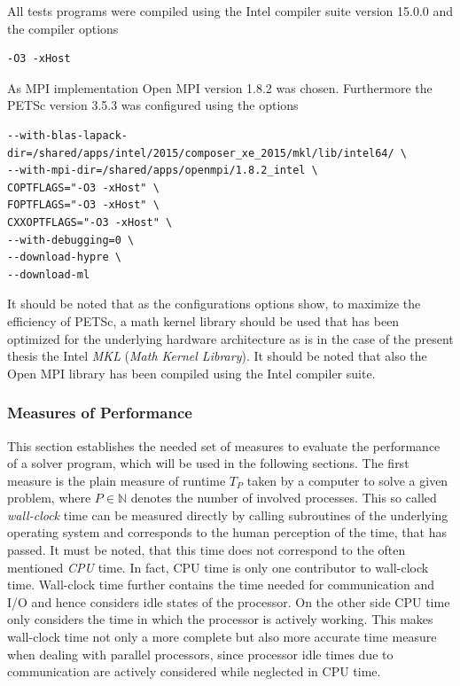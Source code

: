 All tests programs were compiled using the Intel compiler suite version 15.0.0 and the compiler options
\begin{lstlisting}
-O3 -xHost
\end{lstlisting}
As MPI implementation Open MPI version 1.8.2 was chosen. Furthermore the PETSc version 3.5.3 was configured using the options
\begin{lstlisting}
--with-blas-lapack-dir=/shared/apps/intel/2015/composer_xe_2015/mkl/lib/intel64/ \
--with-mpi-dir=/shared/apps/openmpi/1.8.2_intel \
COPTFLAGS="-O3 -xHost" \
FOPTFLAGS="-O3 -xHost" \
CXXOPTFLAGS="-O3 -xHost" \
--with-debugging=0 \
--download-hypre \
--download-ml
\end{lstlisting}
It should be noted that as the configurations options show, to maximize the efficiency of PETSc, a math kernel library should be used that has been optimized for the underlying hardware architecture as is in the case of the present thesis the Intel \emph{MKL} (\emph{Math Kernel Library}). It should be noted that also the Open MPI library has been compiled using the Intel compiler suite.

\subsubsection{Measures of Performance}

This section establishes the needed set of measures to evaluate the performance of a solver program, which will be used in the following sections. The first measure is the plain measure of runtime \(T_P\) taken by a computer to solve a given problem, where \(P \in \mathbb{N}\) denotes the number of involved processes. This so called \emph{wall-clock} time can be measured directly by calling subroutines of the underlying operating system and corresponds to the human perception of the time, that has passed. It must be noted, that this time does not correspond to the often mentioned \emph{CPU} time. In fact, CPU time is only one contributor to wall-clock time. Wall-clock time further contains the time needed for communication and I/O and hence considers idle states of the processor. On the other side CPU time only considers the time in which the processor is actively working. This makes wall-clock time not only a more complete but also more accurate time measure when dealing with parallel processors, since processor idle times due to communication are actively considered while neglected in CPU time.

